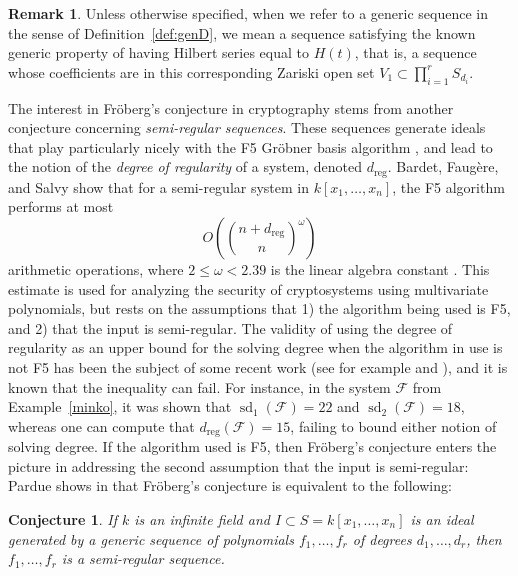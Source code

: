 \documentclass[11pt]{article}
\newcommand{\F}{\mathcal{F}}
\newcommand{\dreg}{d_{\text{reg}}}
\DeclareMathOperator{\sd}{sd}
\newtheorem{conjecture}{Conjecture}
\theoremstyle{definition}
\newtheorem{remark}{Remark}
\begin{document}
\begin{remark}
	Unless otherwise specified, when we refer to a generic sequence in the sense of Definition~\ref{def:genD}, we mean a sequence satisfying the known generic property of having Hilbert series equal to $H(t)$, that is, a sequence whose coefficients are in this corresponding Zariski open set $V_1 \subset \prod_{i = 1}^r S_{d_i}$.
\end{remark}


The interest in Fröberg's conjecture in cryptography stems from another conjecture concerning \emph{semi-regular sequences}. These sequences generate ideals that play particularly nicely with the F5 Gröbner basis algorithm \cite{faugere2002new}, and lead to the notion of the \emph{degree of regularity} of a system, denoted $\dreg$. Bardet, Faugère, and Salvy show that for a semi-regular system in $k[x_1, \dots, x_n]$, the F5 algorithm performs at most \[ O\left( \binom{n + \dreg}{n}^\omega \right) \] arithmetic operations, where $2 \leq \omega < 2.39$ is the linear algebra constant \cite{bardet2004complexity}. This estimate is used for analyzing the security of cryptosystems using multivariate polynomials, but rests on the assumptions that 1) the algorithm being used is F5, and 2) that the input is semi-regular. The validity of using the degree of regularity as an upper bound for the solving degree when the algorithm in use is not F5 has been the subject of some recent work (see for example \cite{caminata2023solving} and \cite{minko2021security}), and it is known that the inequality can fail. For instance, in the system $\F$ from Example~\ref{minko}, it was shown that $\sd_1(\F) = 22$ and $\sd_2(\F) = 18$, whereas one can compute that $\dreg(\F) = 15$, failing to bound either notion of solving degree. If the algorithm used is F5, then Fröberg's conjecture enters the picture in addressing the second assumption that the input is semi-regular: Pardue shows in \cite{pardue2010generic} that Fröberg's conjecture is equivalent to the following:


\begin{conjecture}\label{Fr:equiv}
	If $k$ is an infinite field and $I \subset S = k[x_1, \dots, x_n]$ is an ideal generated by a generic sequence of polynomials $f_1, \dots, f_r$ of degrees $d_1, \dots, d_r$, then $f_1, \dots, f_r$ is a semi-regular sequence. 
\end{conjecture}
\end{document}
